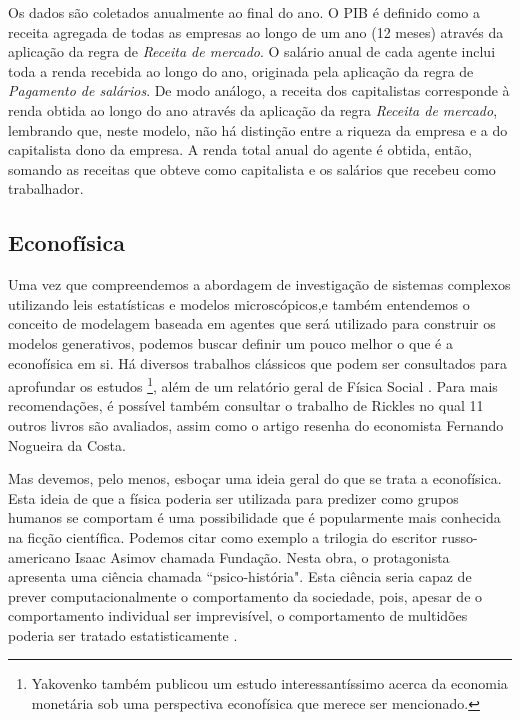 Os dados são coletados anualmente ao final do ano. O PIB é definido como a receita agregada de todas as empresas ao longo de um ano (12 meses) através da aplicação da regra de \textit{Receita de mercado}. O salário anual de cada agente inclui toda a renda recebida ao longo do ano, originada pela aplicação da regra de \textit{Pagamento de salários}. De modo análogo, a receita dos capitalistas corresponde à renda obtida ao longo do ano através da aplicação da regra \textit{Receita de mercado}, lembrando que, neste modelo, não há distinção entre a riqueza da empresa e a do capitalista dono da empresa. A renda total anual do agente é obtida, então, somando as receitas que obteve como capitalista e os salários que recebeu como trabalhador.


\subsection{Econofísica}

Uma vez que compreendemos a abordagem de investigação de sistemas complexos utilizando leis estatísticas e modelos microscópicos,e também entendemos o conceito de modelagem baseada em agentes que será utilizado para construir os modelos generativos, podemos buscar definir um pouco melhor o que é a econofísica em si. Há diversos trabalhos clássicos que podem ser consultados para aprofundar os estudos \cite{cottrell2009classical,slanina2013essentials,Yakovenko2020}\footnote{Yakovenko também publicou um estudo interessantíssimo acerca da economia monetária sob uma perspectiva econofísica \cite{Yakovenko2016} que merece ser mencionado.}, além de um relatório geral de Física Social \cite{JUSUP20221}. Para mais recomendações, é possível também consultar o trabalho de Rickles no qual 11 outros livros são avaliados\cite{RICKLES2007948}, assim como o artigo resenha do economista Fernando Nogueira da Costa\cite{Fernando}.

Mas devemos, pelo menos, esboçar uma ideia geral do que se trata a econofísica. Esta ideia de que a física poderia ser utilizada para predizer como grupos humanos se comportam é uma possibilidade que é popularmente mais conhecida na ficção científica. Podemos citar como exemplo a trilogia do escritor russo-americano Isaac Asimov chamada Fundação. Nesta obra, o protagonista apresenta uma ciência chamada ``psico-história". Esta ciência seria capaz de prever computacionalmente o comportamento da sociedade, pois, apesar de o comportamento individual ser imprevisível, o comportamento de multidões poderia ser tratado estatisticamente \cite{parthum}.

